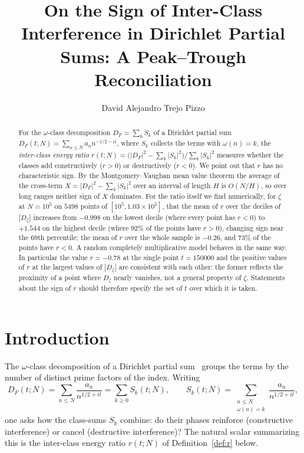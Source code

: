 \documentclass[11pt]{amsart}
\title[Inter-Class Interference]{On the Sign of Inter-Class Interference in Dirichlet
Partial Sums: A Peak--Trough Reconciliation}
\author{David Alejandro Trejo Pizzo}
\theoremstyle{definition}
\theoremstyle{remark}
\begin{document}
\begin{abstract}
For the $\omega$-class decomposition $D_F=\sum_kS_k$ of a Dirichlet
partial sum $D_F(t;N)=\sum_{n\le N}a_n n^{-1/2-it}$, where $S_k$
collects the terms with $\omega(n)=k$, the \emph{inter-class energy
ratio}
$r(t;N)=\big(|D_F|^2-\sum_k|S_k|^2\big)/\sum_k|S_k|^2$
measures whether the classes add constructively ($r>0$) or destructively
($r<0$). We point out that $r$ has no characteristic sign. By the
Montgomery--Vaughan mean value theorem the average of the cross-term
$X=|D_F|^2-\sum_k|S_k|^2$ over an interval of length $H$ is $O(N/H)$, so
over long ranges neither sign of $X$ dominates. For the ratio itself we
find numerically, for $\zeta$ at $N=10^5$ on $5498$ points of
$[10^5,1.03\times10^5]$, that the mean of $r$ over the deciles of
$|D_\zeta|$ increases from $-0.998$ on the lowest decile (where every
point has $r<0$) to $+1.544$ on the highest decile (where $92\%$ of the
points have $r>0$), changing sign near the $69$th percentile; the mean of
$r$ over the whole sample is $-0.26$, and $73\%$ of the points have
$r<0$. A random completely multiplicative model behaves in the same way.
In particular the value $r=-0.78$ at the single point $t=150000$ and the
positive values of $r$ at the largest values of $|D_\zeta|$ are
consistent with each other: the former reflects the proximity of a point
where $D_\zeta$ nearly vanishes, not a general property of $\zeta$. Statements about the
sign of $r$ should therefore specify the set of $t$ over which it is
taken.
\end{abstract}

\maketitle



\section{Introduction}
\label{sec:intro}

The $\omega$-class decomposition of a Dirichlet partial sum~\cite{P02}
groups the terms by the number of distinct prime factors of the index.
Writing
\begin{equation}\label{eq:Sk}
D_F(t;N)=\sum_{n\le N}\frac{a_n}{n^{1/2+it}}
=\sum_{k\ge0}S_k(t;N),\qquad
S_k(t;N)=\sum_{\substack{n\le N\\\omega(n)=k}}\frac{a_n}{n^{1/2+it}},
\end{equation}
one asks how the class-sums $S_k$ combine: do their phases reinforce
(constructive interference) or cancel (destructive interference)? The
natural scalar summarizing this is the inter-class energy ratio
$r(t;N)$ of Definition~\ref{def:r} below.
\end{document}
